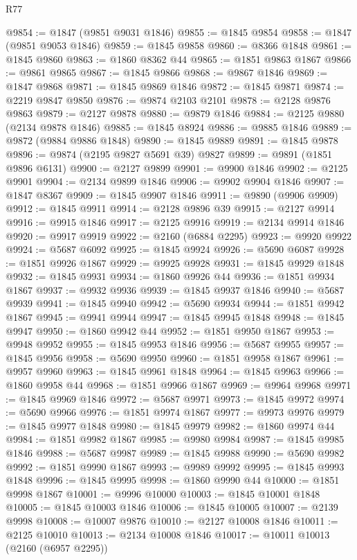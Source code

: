 \begin{lexlean}{R77}
\begin{coremodule}
@9854 := @1847 (@9851 @9031 @1846)
@9855 := @1845 @9854
@9858 := @1847 (@9851 @9053 @1846)
@9859 := @1845 @9858
@9860 := @8366 @1848
@9861 := @1845 @9860
@9863 := @1860 @8362 @44
@9865 := @1851 @9863 @1867
@9866 := @9861 @9865
@9867 := @1845 @9866
@9868 := @9867 @1846
@9869 := @1847 @9868
@9871 := @1845 @9869 @1846
@9872 := @1845 @9871
@9874 := @2219 @9847 @9850
@9876 := @9874 @2103 @2101
@9878 := @2128 @9876 @9863
@9879 := @2127 @9878
@9880 := @9879 @1846
@9884 := @2125 @9880 (@2134 @9878 @1846)
@9885 := @1845 @8924
@9886 := @9885 @1846
@9889 := @9872 (@9884 @9886 @1848)
@9890 := @1845 @9889
@9891 := @1845 @9878
@9896 := @9874 (@2195 @9827 @5691 @39) @9827
@9899 := @9891 (@1851 @9896 @6131)
@9900 := @2127 @9899
@9901 := @9900 @1846
@9902 := @2125 @9901
@9904 := @2134 @9899 @1846
@9906 := @9902 @9904 @1846
@9907 := @1847 @8367
@9909 := @1845 @9907 @1846
@9911 := @9890 (@9906 @9909)
@9912 := @1845 @9911
@9914 := @2128 @9896 @39
@9915 := @2127 @9914
@9916 := @9915 @1846
@9917 := @2125 @9916
@9919 := @2134 @9914 @1846
@9920 := @9917 @9919
@9922 := @2160 (@6884 @2295)
@9923 := @9920 @9922
@9924 := @5687 @6092
@9925 := @1845 @9924
@9926 := @5690 @6087
@9928 := @1851 @9926 @1867
@9929 := @9925 @9928
@9931 := @1845 @9929 @1848
@9932 := @1845 @9931
@9934 := @1860 @9926 @44
@9936 := @1851 @9934 @1867
@9937 := @9932 @9936
@9939 := @1845 @9937 @1846
@9940 := @5687 @9939
@9941 := @1845 @9940
@9942 := @5690 @9934
@9944 := @1851 @9942 @1867
@9945 := @9941 @9944
@9947 := @1845 @9945 @1848
@9948 := @1845 @9947
@9950 := @1860 @9942 @44
@9952 := @1851 @9950 @1867
@9953 := @9948 @9952
@9955 := @1845 @9953 @1846
@9956 := @5687 @9955
@9957 := @1845 @9956
@9958 := @5690 @9950
@9960 := @1851 @9958 @1867
@9961 := @9957 @9960
@9963 := @1845 @9961 @1848
@9964 := @1845 @9963
@9966 := @1860 @9958 @44
@9968 := @1851 @9966 @1867
@9969 := @9964 @9968
@9971 := @1845 @9969 @1846
@9972 := @5687 @9971
@9973 := @1845 @9972
@9974 := @5690 @9966
@9976 := @1851 @9974 @1867
@9977 := @9973 @9976
@9979 := @1845 @9977 @1848
@9980 := @1845 @9979
@9982 := @1860 @9974 @44
@9984 := @1851 @9982 @1867
@9985 := @9980 @9984
@9987 := @1845 @9985 @1846
@9988 := @5687 @9987
@9989 := @1845 @9988
@9990 := @5690 @9982
@9992 := @1851 @9990 @1867
@9993 := @9989 @9992
@9995 := @1845 @9993 @1848
@9996 := @1845 @9995
@9998 := @1860 @9990 @44
@10000 := @1851 @9998 @1867
@10001 := @9996 @10000
@10003 := @1845 @10001 @1848
@10005 := @1845 @10003 @1846
@10006 := @1845 @10005
@10007 := @2139 @9998
@10008 := @10007 @9876
@10010 := @2127 @10008 @1846
@10011 := @2125 @10010
@10013 := @2134 @10008 @1846
@10017 := @10011 @10013 (@2160 (@6957 @2295))

\end{coremodule}
\end{lexlean}
